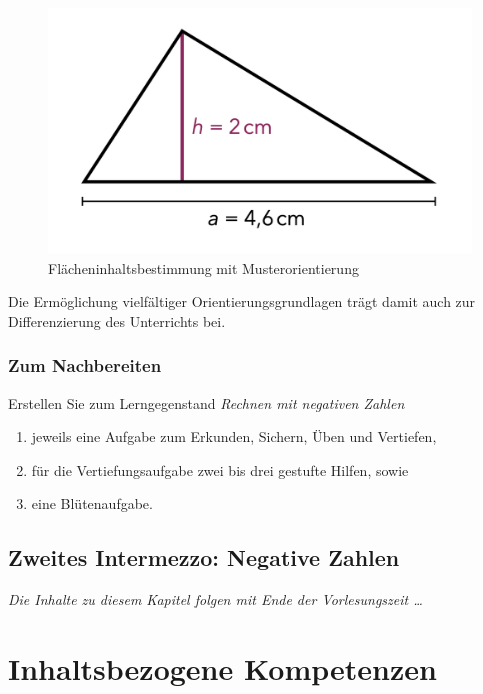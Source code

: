 \documentclass[
]{scrbook}
\theoremstyle{definition}
\theoremstyle{definition}
\theoremstyle{definition}
\theoremstyle{definition}
\theoremstyle{remark}
\begin{document}
\begin{figure}

{\centering \includegraphics[width=0.5\linewidth]{pictures/8-Aufgabenorientierung} 

}

\caption{Flächeninhaltsbestimmung mit Musterorientierung}\label{fig:Aufgabenorientierung}
\end{figure}

Die Ermöglichung vielfältiger Orientierungsgrundlagen trägt damit auch zur Differenzierung des Unterrichts bei.

\hypertarget{aufgaben-gestalten-nachbereitung}{%
\section{Zum Nachbereiten}\label{aufgaben-gestalten-nachbereitung}}

Erstellen Sie zum Lerngegenstand \emph{Rechnen mit negativen Zahlen}

\begin{enumerate}
\def\labelenumi{\alph{enumi})}
\item
  jeweils eine Aufgabe zum Erkunden, Sichern, Üben und Vertiefen,
\item
  für die Vertiefungsaufgabe zwei bis drei gestufte Hilfen, sowie
\item
  eine Blütenaufgabe.
\end{enumerate}

\hypertarget{zweites-intermezzo-negative-zahlen}{%
\chapter{Zweites Intermezzo: Negative Zahlen}\label{zweites-intermezzo-negative-zahlen}}

\emph{Die Inhalte zu diesem Kapitel folgen mit Ende der Vorlesungszeit \ldots{}}

\hypertarget{part-inhaltsbezogene-kompetenzen}{%
\part*{Inhaltsbezogene Kompetenzen}\label{part-inhaltsbezogene-kompetenzen}}
\end{document}
